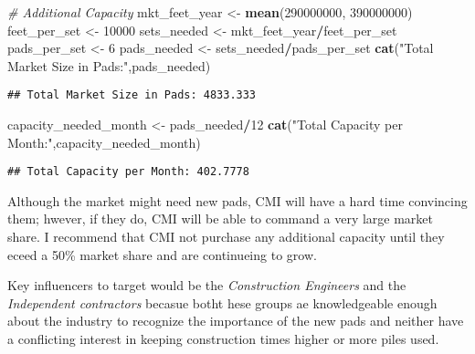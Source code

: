 \documentclass[]{article}
\newenvironment{Shaded}{\begin{snugshade}}{\end{snugshade}}
\newcommand{\KeywordTok}[1]{\textcolor[rgb]{0.13,0.29,0.53}{\textbf{#1}}}
\newcommand{\DecValTok}[1]{\textcolor[rgb]{0.00,0.00,0.81}{#1}}
\newcommand{\StringTok}[1]{\textcolor[rgb]{0.31,0.60,0.02}{#1}}
\newcommand{\CommentTok}[1]{\textcolor[rgb]{0.56,0.35,0.01}{\textit{#1}}}
\newcommand{\OperatorTok}[1]{\textcolor[rgb]{0.81,0.36,0.00}{\textbf{#1}}}
\newcommand{\NormalTok}[1]{#1}
\begin{document}
\begin{Shaded}
\begin{Highlighting}[]
\CommentTok{# Additional Capacity}
\NormalTok{mkt_feet_year <-}\StringTok{ }\KeywordTok{mean}\NormalTok{(}\DecValTok{290000000}\NormalTok{, }\DecValTok{390000000}\NormalTok{)}
\NormalTok{feet_per_set <-}\StringTok{ }\DecValTok{10000}
\NormalTok{sets_needed <-}\StringTok{ }\NormalTok{mkt_feet_year}\OperatorTok{/}\NormalTok{feet_per_set}
\NormalTok{pads_per_set <-}\StringTok{ }\DecValTok{6}
\NormalTok{pads_needed <-}\StringTok{ }\NormalTok{sets_needed}\OperatorTok{/}\NormalTok{pads_per_set}
\KeywordTok{cat}\NormalTok{(}\StringTok{"Total Market Size in Pads:"}\NormalTok{,pads_needed)}
\end{Highlighting}
\end{Shaded}

\begin{verbatim}
## Total Market Size in Pads: 4833.333
\end{verbatim}

\begin{Shaded}
\begin{Highlighting}[]
\NormalTok{capacity_needed_month <-}\StringTok{ }\NormalTok{pads_needed}\OperatorTok{/}\DecValTok{12}
\KeywordTok{cat}\NormalTok{(}\StringTok{"Total Capacity per Month:"}\NormalTok{,capacity_needed_month)}
\end{Highlighting}
\end{Shaded}

\begin{verbatim}
## Total Capacity per Month: 402.7778
\end{verbatim}

Although the market might need new pads, CMI will have a hard time
convincing them; hwever, if they do, CMI will be able to command a very
large market share. I recommend that CMI not purchase any additional
capacity until they eceed a 50\% market share and are continueing to
grow.

Key influencers to target would be the \emph{Construction Engineers} and
the \emph{Independent contractors} becasue botht hese groups ae
knowledgeable enough about the industry to recognize the importance of
the new pads and neither have a conflicting interest in keeping
construction times higher or more piles used.
\end{document}

